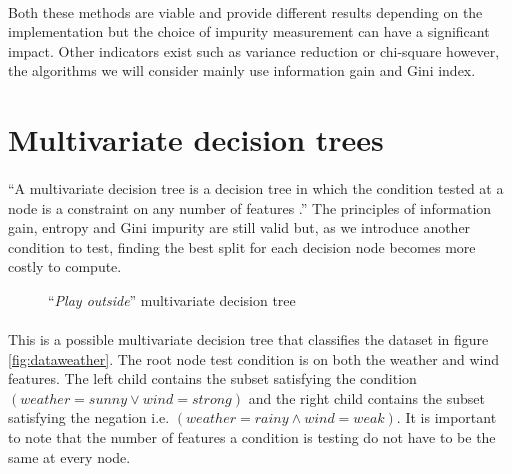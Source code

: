 \documentclass[12pt]{report}
\theoremstyle{definition}
\theoremstyle{definition}
\theoremstyle{definition}
\begin{document}
\paragraph{} Both these methods are viable and provide different results depending on the implementation but
the choice of impurity measurement can have a significant impact. Other indicators exist such as variance 
reduction or chi-square however, the algorithms we will consider mainly use information gain and Gini index.

\section{Multivariate decision trees}
\paragraph{} ``A multivariate decision tree is a decision tree in which the condition tested at a node is a constraint on
any number of features \cite{multivariate-explaining}.'' The principles of information gain, entropy and Gini
impurity are still valid but, as we introduce another condition to test, finding the best split for each
decision node becomes more costly to compute.

\begin{figure}[h]
    \centering
    \caption{``\textit{Play outside}'' multivariate decision tree}
    \label{fig:multitree}
\end{figure}

\paragraph{} This is a possible multivariate decision tree that classifies the dataset in figure \ref{fig:dataweather}.
The root node test condition is on both the weather and wind features. The left child contains the subset
satisfying the condition $(weather=sunny \lor wind=strong)$ and the right child contains the subset satisfying
the negation i.e. $(weather=rainy \land wind=weak)$. It is important to note that the number of features a
condition is testing do not have to be the same at every node.
\end{document}
